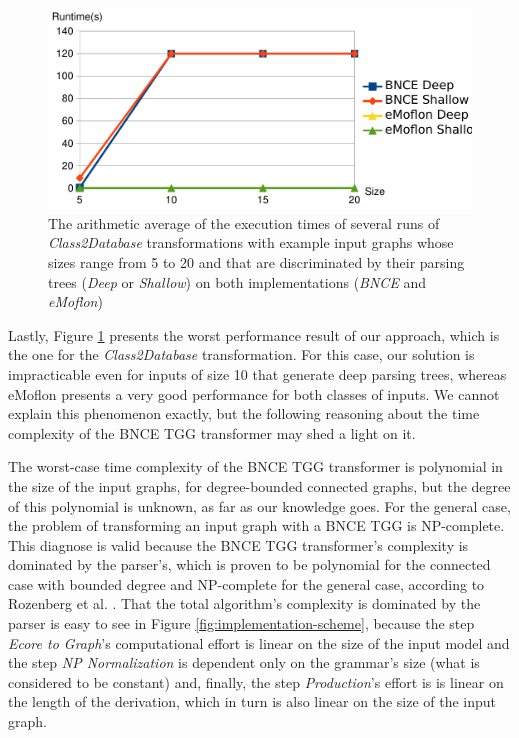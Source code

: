 \begin{figure}
	\centering
	\includegraphics[width=.6\textwidth]{figures/performance/class2database}
	\caption{The arithmetic average of the execution times of several runs of \emph{Class2Database} transformations with example input graphs whose sizes range from 5 to 20 and that are discriminated by their parsing trees (\emph{Deep} or \emph{Shallow}) on both implementations (\emph{BNCE} and \emph{eMoflon})}
	\label{fig:performance-class2database}
\end{figure}

Lastly, Figure \ref{fig:performance-class2database} presents the worst performance result of our approach, which is the one for the \emph{Class2Database} transformation. For this case, our solution is impracticable even for inputs of size 10 that generate deep parsing trees, whereas eMoflon presents a very good performance for both classes of inputs. We cannot explain this phenomenon exactly, but the following reasoning about the time complexity of the BNCE TGG transformer may shed a light on it.

The worst-case time complexity of the BNCE TGG transformer is polynomial in the size of the input graphs, for degree-bounded connected graphs, but the degree of this polynomial is unknown, as far as our knowledge goes. For the general case, the problem of transforming an input graph with a BNCE TGG is NP-complete. This diagnose is valid because the BNCE TGG transformer's complexity is dominated by the parser's, which is proven to be polynomial for the connected case with bounded degree and NP-complete for the general case, according to Rozenberg et al. \cite[p. 160]{rozenberg1986boundary}. That the total algorithm's complexity is dominated by the parser is easy to see in Figure \ref{fig:implementation-scheme}, because the step \emph{Ecore to Graph}'s computational effort is linear on the size of the input model and the step \emph{NP Normalization} is dependent only on the grammar's size (what is considered to be constant) and, finally, the step \emph{Production}'s effort is is linear on the length of the derivation, which in turn is also linear on the size of the input graph.


